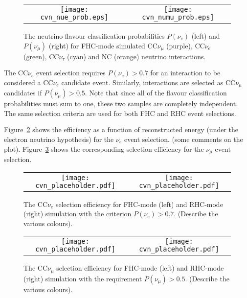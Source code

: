 \begin{figure}
    \centering
    \begin{tabular}{cc}
		\texttt{[image: cvn\_nue\_prob.eps]} &
		\texttt{[image: cvn\_numu\_prob.eps]} 
	\end{tabular}
	\caption{The neutrino flavour classification probabilities $P(\nu_e)$ (left) and $P(\nu_\mu)$ (right) for FHC-mode simulated CC$\nu_\mu$ (purple), CC$\nu_e$ (green), CC$\nu_\tau$ (cyan) and NC (orange) neutrino interactions.}
    \label{fig:cvnprob}
\end{figure}

The CC$\nu_e$ event selection requires $P(\nu_e) > 0.7$ for an interaction to be considered a CC$\nu_e$ candidate event. Similarly, interactions are selected as CC$\nu_\mu$ candidates if $P(\nu_\mu) > 0.5$. Note that since all of the flavour classification probabilities must sum to one, these two samples are completely independent. The same selection criteria are used for both FHC and RHC event selections.

Figure~\ref{fig:nueeff} shows the efficiency as a function of reconstructed energy (under the electron neutrino hypothesis) for the $\nu_e$ event selection. (some comments on the plot). Figure~\ref{fig:numueff} shows the corresponding selection efficiency for the $\nu_\mu$ event selection.

\begin{figure}
    \centering
    \begin{tabular}{cc}
		\texttt{[image: cvn\_placeholder.pdf]} &
		\texttt{[image: cvn\_placeholder.pdf]} 
	\end{tabular}
	\caption{The CC$\nu_e$ selection efficiency for FHC-mode (left) and RHC-mode (right) simulation with the criterion $P(\nu_e) > 0.7$. (Describe the various colours).}
    \label{fig:nueeff}
\end{figure}

\begin{figure}
    \centering
    \begin{tabular}{cc}
		\texttt{[image: cvn\_placeholder.pdf]} &
		\texttt{[image: cvn\_placeholder.pdf]} 
	\end{tabular}
	\caption{The CC$\nu_\mu$ selection efficiency for FHC-mode (left) and RHC-mode (right) simulation with the requirement $P(\nu_\mu) > 0.5$. (Describe the various colours).}
    \label{fig:numueff}
\end{figure}

